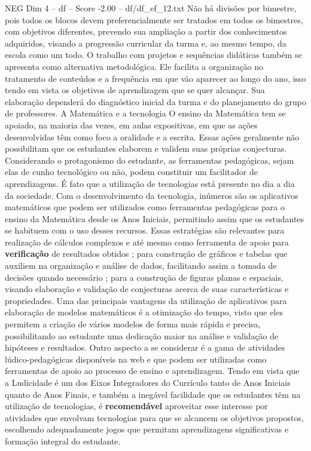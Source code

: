 \begin{textsample}{NEG Dim 4 – df – Score -2.00 – df/df\_ef\_12.txt}
Não há divisões por bimestre, pois todos os blocos devem preferencialmente ser tratados em todos os bimestres, com objetivos diferentes, prevendo sua ampliação a partir dos conhecimentos adquiridos, visando a progressão curricular da turma e, ao mesmo tempo, da escola como um todo.
O trabalho com projetos e sequências didáticas também se apresenta como alternativa metodológica.
Ele facilita a organização no tratamento de conteúdos e a frequência em que vão aparecer ao longo do ano, isso tendo em vista os objetivos de aprendizagem que se quer alcançar.
Sua elaboração dependerá do diagnóstico inicial da turma e do planejamento do grupo de professores.
A Matemática e a tecnologia O ensino da Matemática tem se apoiado, na maioria das vezes, em aulas expositivas, em que as ações desenvolvidas têm como foco a oralidade e a escrita.
Essas ações geralmente não possibilitam que os estudantes elaborem e validem suas próprias conjecturas.
Considerando o protagonismo do estudante, as ferramentas pedagógicas, sejam elas de cunho tecnológico ou não, podem constituir um facilitador de aprendizagens.
É fato que a utilização de tecnologias está presente no dia a dia da sociedade.
Com o desenvolvimento da tecnologia, inúmeros são os aplicativos matemáticos que podem ser utilizados como ferramentas pedagógicas para o ensino da Matemática desde os Anos Iniciais, permitindo assim que os estudantes se habituem com o uso desses recursos.
Essas estratégias são relevantes para realização de cálculos complexos e até mesmo como ferramenta de apoio para \textbf{verificação} de resultados obtidos ; para construção de gráficos e tabelas que auxiliem na organização e análise de dados, facilitando assim a tomada de decisões quando necessário ; para a construção de figuras planas e espaciais, visando elaboração e validação de conjecturas acerca de suas características e propriedades.
Uma das principais vantagens da utilização de aplicativos para elaboração de modelos matemáticos é a otimização do tempo, visto que eles permitem a criação de vários modelos de forma mais rápida e precisa, possibilitando ao estudante uma dedicação maior na análise e validação de hipóteses e resultados.
Outro aspecto a se considerar é a gama de atividades lúdico-pedagógicas disponíveis na web e que podem ser utilizadas como ferramentas de apoio ao processo de ensino e aprendizagem.
Tendo em vista que a Ludicidade é um dos Eixos Integradores do Currículo tanto de Anos Iniciais quanto de Anos Finais, e também a inegável facilidade que os estudantes têm na utilização de tecnologias, é \textbf{recomendável} aproveitar esse interesse por atividades que envolvam tecnologias para que se alcancem os objetivos propostos, escolhendo adequadamente jogos que permitam aprendizagens significativas e formação integral do estudante.

\end{textsample}
